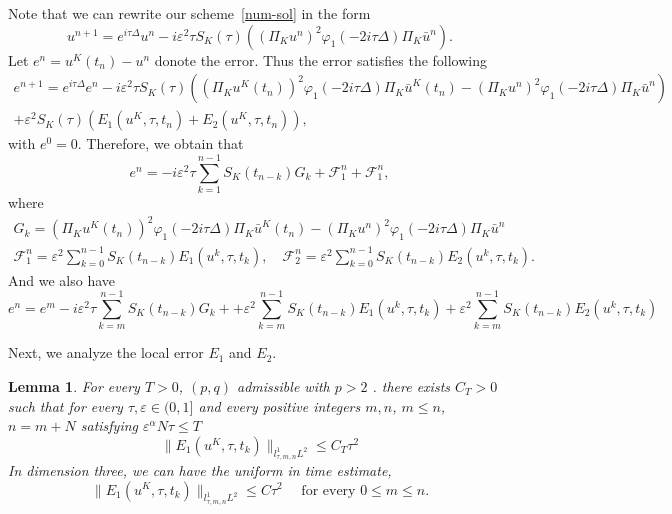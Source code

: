 \documentclass[10pt,a4paper]{article}
\newtheorem{lemma}[theorem]{Lemma}
\begin{document}
  Note that we can rewrite our scheme~\eqref{num-sol} in the form 
  \[ 
    u^{n+1} = e^{i\tau\Delta}u^n - i\varepsilon^2\tau S_K(\tau) 
    \left( (\Pi_K u^n)^2 \varphi_1(-2i\tau\Delta)\Pi_K \bar{u}^n \right).
  \]
  Let \( e^n = u^K(t_n) - u^n \) donote the error. Thus the error satisfies 
  the following 
  \begin{multline}
    e^{n+1} = e^{i\tau\Delta}e^n - i \varepsilon^2 \tau S_K(\tau) \left( 
    \left(\Pi_K u^K(t_n)\right)^2 \varphi_1(-2i\tau\Delta)\Pi_K \bar{u}^K(t_n)
    - (\Pi_K u^n)^2 \varphi_1(-2i\tau\Delta)\Pi_K \bar{u}^n \right) \\ 
    + \varepsilon^2 S_K(\tau) \left( E_1(u^K, \tau, t_n) + E_2(u^K, \tau, t_n) 
    \right),
  \end{multline}
  with \( e^0 = 0 \). Therefore, we obtain that 
  \begin{equation}
    e^n = -i \varepsilon^2 \tau \sum_{k=1}^{n-1}
    S_K(t_{n-k})G_k + \mathcal F_1^{n} + \mathcal F_1^{n},
  \end{equation}
  where
  \begin{align}
    \label{Gk} G_k = \left(\Pi_K u^K(t_n)\right)^2 \varphi_1(-2i\tau\Delta)\Pi_K 
    \bar{u}^K(t_n) - (\Pi_K u^n)^2 \varphi_1(-2i\tau\Delta)\Pi_K \bar{u}^n \\
    \label{F1F2} \mathcal F^{n}_1 = \varepsilon^2 \sum_{k=0}^{n-1} S_K(t_{n-k}) E_1(u^k, \tau, t_k), \quad
    \mathcal F^{n}_2 = \varepsilon^2 \sum_{k=0}^{n-1} S_K(t_{n-k}) E_2(u^k, \tau, t_k).
  \end{align}
  And we also have 
  \begin{equation}\label{emn}
    e^n = e^m -i \varepsilon^2 \tau \sum_{k=m}^{n-1}
    S_K(t_{n-k})G_k + 
    + \varepsilon^2 \sum_{k=m}^{n-1} S_K(t_{n-k}) E_1(u^k, \tau, t_k)
    + \varepsilon^2 \sum_{k=m}^{n-1} S_K(t_{n-k}) E_2(u^k, \tau, t_k)
  \end{equation}
  
  Next, we analyze the local error \(E_1\) and \(E_2\).

  \begin{lemma}\label{lemE1} %
    For every \( T > 0 \), \( (p, q) \) admissible with \( p > 2 \) .
    there exists \(C_T>0\) such that for every \( \tau, \varepsilon
    \in (0,1] \) and every positive integers \(m,n\), \(m \leq n\),\(n=m+N\)
    satisfying \(\varepsilon^\alpha N\tau \leq T\)
    \begin{equation}
      \|E_1(u^K,\tau,t_k)\|_{l^1_{\tau,m,n}L^2} \leq C_T \tau^2
    \end{equation}
    In dimension three, we can have the uniform in time estimate,
    \begin{equation}
      \|E_1(u^K,\tau,t_k)\|_{l^1_{\tau,m,n}L^2} \leq C \tau^2 \quad \text{ for
      every } 0 \leq m \leq n.
    \end{equation}
  \end{lemma}
\end{document}
